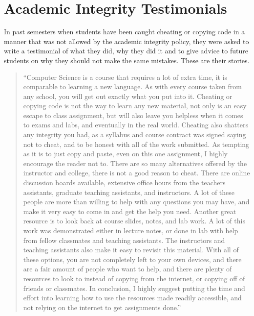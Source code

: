 \documentclass[12pt]{scrartcl}
\begin{document}
\newpage
\section*{Academic Integrity Testimonials}

In past semesters when students have been caught cheating or copying code in
a manner that was not allowed by the academic integrity policy, they were asked
to write a testimonial of what they did, why they did it and to give advice
to future students on why they should not make the same mistakes.  These
are their stories.

\begin{quote}
``Computer Science is a course that requires a lot of extra time, it is comparable to learning a new language. As with every course taken from any school, you will get out exactly what you put into it. Cheating or copying code is not the way to learn any new material, not only is an easy escape to class assignment, but will also leave you helpless when it comes to exams and labs, and eventually in the real world. Cheating also shatters any integrity you had, as a syllabus and course contract was signed saying not to cheat, and to be honest with all of the work submitted. As tempting as it is to just copy and paste, even on this one assignment, I highly encourage the reader not to. There are so many alternatives offered by the instructor and college, there is not a good reason to cheat. There are online discussion boards available, extensive office hours from the teachers assistants, graduate teaching assistants, and instructors. A lot of these people are more than willing to help with any questions you may have, and make it very easy to come in and get the help you need. Another great resource is to look back at course slides, notes, and lab work. A lot of this work was demonstrated either in lecture notes, or done in lab with help from fellow classmates and teaching assistants. The instructors and teaching assistants also make it easy to revisit this material.  With all of these options, you are not completely left to your own devices, and there are a fair amount of people who want to help, and there are plenty of resources to look to instead of copying from the internet, or copying off of friends or classmates. In conclusion, I highly suggest putting the time and effort into learning how to use the resources made readily accessible, and not relying on the internet to get assignments done.''
\end{quote}
\end{document}
